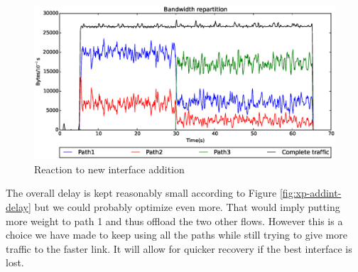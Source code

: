 \begin{figure}[!ht]
\centering
\includegraphics[width=\textwidth]{images/xp/addint_bw.eps}
\caption{Reaction to new interface addition}
\label{fig:xp-addint-bw}
\end{figure}

The overall delay is kept reasonably small according to Figure \ref{fig:xp-addint-delay} but we could probably optimize even more. That would imply putting more weight to path 1 and thus offload the two other flows. However this is a choice we have made to keep using all the paths while still trying to give more traffic to the faster link. It will allow for quicker recovery if the best interface is lost.

